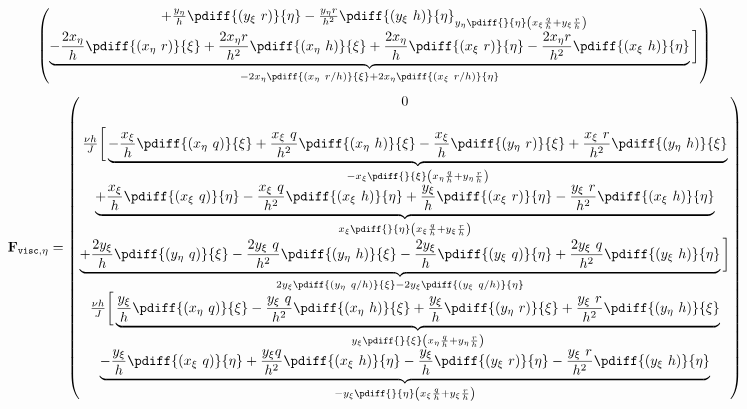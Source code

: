 {{\begin{align}
\begin{pmatrix}
{				+ \frac{y_{\eta}}{h} \pdiff{(y_{\xi}\ r)}{\eta}
				- \frac{y_{\eta}r}{h^2} \pdiff{(y_{\xi}\ h)}{\eta}}_{ y_{\eta} \pdiff{}{\eta} \left(
				x_{\xi} \frac{q}{h} + y_{\xi} \frac{r}{h}  \right)}\\
			\underbrace{- \frac{2 x_{\eta}}{h} \pdiff{(x_{\eta}\ r)}{\xi}
				+ \frac{2 x_{\eta}r}{h^2} \pdiff{(x_{\eta}\  h)}{\xi}
				+ \frac{2 x_{\eta}}{h}  \pdiff{(x_{\xi}\ r)}{\eta}
				- \frac{2 x_{\eta}r}{h^2}  \pdiff{(x_{\xi}\ h)}{\eta}}_{        - 2 x_{\eta} \pdiff{(x_{\eta}\ r/h)}{\xi}
				+ 2 x_{\eta}  \pdiff{(x_{\xi}\ r/h)}{\eta}}\bigg]
		\end{pmatrix}
	\end{align}
	\begin{align}
		\mathbf{F}_{\texttt{visc},\eta}=
		\begin{pmatrix}
			0 \\
			\\
			\frac{\nu h}{J} \bigg[
			\underbrace{- \frac{x_{\xi} }{h}\pdiff{(x_{\eta}\ q)}{\xi}
				+ \frac{x_{\xi}\ q}{h^2}\pdiff{(x_{\eta}\ h)}{\xi}
				- \frac{x_{\xi}}{h} \pdiff{(y_{\eta}\ r)}{\xi}
				+ \frac{x_{\xi}\ r}{h^2}\pdiff{(y_{\eta}\ h)}{\xi}}_{ - x_{\xi} \pdiff{}{\xi}\left( x_{\eta}\frac{q}{h} + y_{\eta}\frac{r}{h}  \right)}\\
			\underbrace{+\frac{x_{\xi}}{h} \pdiff{(x_{\xi}\ q)}{\eta}
				-\frac{x_{\xi}\ q}{h^2}\pdiff{(x_{\xi}\ h)}{\eta}
				+ \frac{y_{\xi}}{h} \pdiff{(x_{\xi}\ r)}{\eta}
				- \frac{y_{\xi}\ r}{h^2} \pdiff{(x_{\xi}\ h)}{\eta}}_{ x_{\xi} \pdiff{}{\eta}\left( x_{\xi} \frac{q}{h} + y_{\xi} \frac{r}{h}  \right)}\\
			\underbrace{+ \frac{2 y_{\xi}}{h} \pdiff{(y_{\eta}\ q)}{\xi}
				- \frac{2 y_{\xi}\ q}{h^2} \pdiff{(y_{\eta}\ h)}{\xi}
				- \frac{2 y_{\xi}}{h} \pdiff{(y_{\xi}\ q)}{\eta}
				+ \frac{2 y_{\xi}\ q}{h^2} \pdiff{(y_{\xi}\ h)}{\eta} }_{        2 y_{\xi} \pdiff{(y_{\eta}\ q/h)}{\xi}
				- 2 y_{\xi} \pdiff{(y_{\xi}\ q/h)}{\eta}}
			\bigg]\\
			\frac{\nu h}{J} \bigg[
			\underbrace{\frac{y_{\xi} }{h} \pdiff{(x_{\eta}\ q)}{\xi}
				- \frac{y_{\xi}\ q}{h^2} \pdiff{(x_{\eta}\ h)}{\xi}
				+ \frac{y_{\xi} }{h} \pdiff{(y_{\eta}\ r)}{\xi}
				+ \frac{y_{\xi}\ r}{h^2} \pdiff{(y_{\eta}\ h)}{\xi}}_{y_{\xi} \pdiff{}{\xi} \left(x_{\eta} \frac{q}{h}
				+ y_{\eta} \frac{r}{h} \right)} \\
			\underbrace{- \frac{y_{\xi}}{h} \pdiff{(x_{\xi}\ q)}{\eta}
				+ \frac{y_{\xi}q}{h^2} \pdiff{(x_{\xi}\ h)}{\eta}
				- \frac{y_{\xi}}{h} \pdiff{(y_{\xi}\ r)}{\eta}
				- \frac{y_{\xi}\ r}{h^2} \pdiff{(y_{\xi}\ h)}{\eta}}_{- y_{\xi} \pdiff{}{\eta} \left( x_{\xi} \frac{q}{h} +  y_{\xi} \frac{r}{h} \right)} \\

\end{pmatrix}
\end{align}}}
